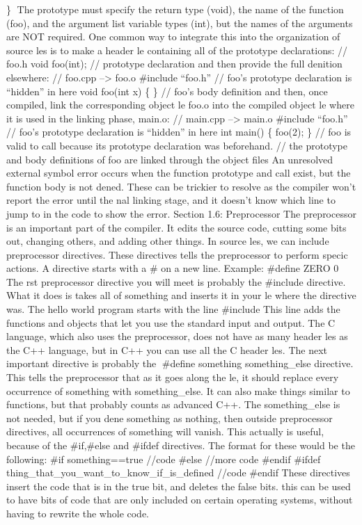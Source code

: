 \} The prototype must specify the return type (void), the name of the
function (foo), and the argument list variable types (int), but the
names of the arguments are NOT required. One common way to integrate
this into the organization of source les is to make a header le
containing all of the prototype declarations: // foo.h void foo(int); //
prototype declaration and then provide the full denition elsewhere: //
foo.cpp --\textgreater{} foo.o \#include ``foo.h'' // foo's prototype
declaration is ``hidden'' in here void foo(int x) \{ \} // foo's body
definition and then, once compiled, link the corresponding object le
foo.o into the compiled object le where it is used in the linking phase,
main.o: // main.cpp --\textgreater{} main.o \#include ``foo.h'' // foo's
prototype declaration is ``hidden'' in here int main() \{ foo(2); \} //
foo is valid to call because its prototype declaration was beforehand.
// the prototype and body definitions of foo are linked through the
object files An unresolved external symbol error occurs when the
function prototype and call exist, but the function body is not dened.
These can be trickier to resolve as the compiler won't report the error
until the nal linking stage, and it doesn't know which line to jump to
in the code to show the error. Section 1.6: Preprocessor The
preprocessor is an important part of the compiler. It edits the source
code, cutting some bits out, changing others, and adding other things.
In source les, we can include preprocessor directives. These directives
tells the preprocessor to perform specic actions. A directive starts
with a \# on a new line. Example: \#define ZERO 0 The rst preprocessor
directive you will meet is probably the \#include directive. What it
does is takes all of something and inserts it in your le where the
directive was. The hello world program starts with the line \#include
This line adds the functions and objects that let you use the standard
input and output. The C language, which also uses the preprocessor, does
not have as many header les as the C++ language, but in C++ you can use
all the C header les. The next important directive is probably the
\#define something something\_else directive. This tells the
preprocessor that as it goes along the le, it should replace every
occurrence of something with something\_else. It can also make things
similar to functions, but that probably counts as advanced C++. The
something\_else is not needed, but if you dene something as nothing,
then outside preprocessor directives, all occurrences of something will
vanish. This actually is useful, because of the \#if,\#else and \#ifdef
directives. The format for these would be the following: \#if
something==true //code \#else //more code \#endif \#ifdef
thing\_that\_you\_want\_to\_know\_if\_is\_defined //code \#endif These
directives insert the code that is in the true bit, and deletes the
false bits. this can be used to have bits of code that are only included
on certain operating systems, without having to rewrite the whole code.

